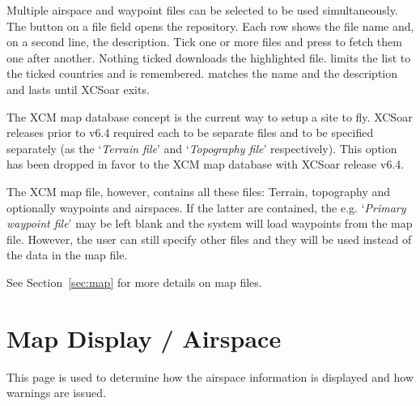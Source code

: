 Multiple airspace and waypoint files can be selected to be used simultaneously.
The  button on a file field opens the repository. Each
row shows the file name and, on a second line, the description. Tick one
or more files and press  to fetch them one after another.
Nothing ticked downloads the highlighted file.  limits
the list to the ticked countries and is remembered. 
matches the name and the description and lasts until XCSoar exits.

The XCM map database concept is the current way to setup a site to fly.
XCSoar releases prior to v6.4 required each to be separate files and to be
specified separately (as the `{\it Terrain file}' and `{\it Topography file}' respectively). This 
option has been dropped in favor to the XCM map database with XCSoar release v6.4.  

The XCM map file, however, contains all these files: Terrain, topography
and optionally waypoints and airspaces.  If the latter are contained, the e.g. `{\it Primary waypoint file}' 
may be left blank and the system will load waypoints from the map file. 
However, the user can still specify other files and they will be used instead of 
the data in the map file.

See Section~\ref{sec:map} for more details on map files.


\section{Map Display / Airspace}\label{sec:map-airspace}

This page is used to determine how the airspace information is
displayed and how warnings are issued.

